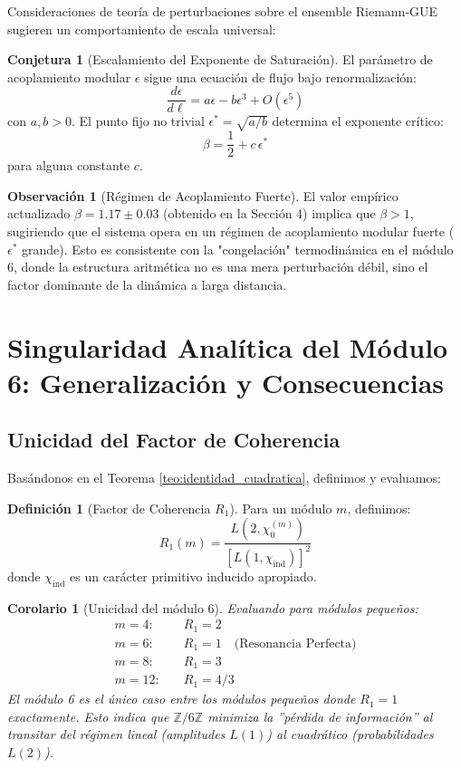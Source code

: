 \documentclass[12pt, a4paper]{article}
\theoremstyle{plain}
\newtheorem{corolario}[teorema]{Corolario}
\theoremstyle{definition}
\newtheorem{definicion}[teorema]{Definición}
\newtheorem{observacion}[teorema]{Observación}
\newtheorem{conjetura}[teorema]{Conjetura}
\newcommand{\Z}{\mathbb{Z}}
\begin{document}
Consideraciones de teoría de perturbaciones sobre el ensemble Riemann-GUE sugieren un comportamiento de escala universal:

\begin{conjetura}[Escalamiento del Exponente de Saturación]
El parámetro de acoplamiento modular $\epsilon$ sigue una ecuación de flujo bajo renormalización:
\[
\frac{d\epsilon}{d\ell} = a\epsilon - b\epsilon^3 + O(\epsilon^5)
\]
con $a, b > 0$. El punto fijo no trivial $\epsilon^* = \sqrt{a/b}$ determina el exponente crítico:
\[
\beta = \frac{1}{2} + c\,\epsilon^*
\]
para alguna constante $c$.
\end{conjetura}

\begin{observacion}[Régimen de Acoplamiento Fuerte]
El valor empírico actualizado $\beta = 1.17 \pm 0.03$ (obtenido en la Sección 4) implica que $\beta > 1$, sugiriendo que el sistema opera en un régimen de acoplamiento modular fuerte ($\epsilon^*$ grande). Esto es consistente con la "congelación" termodinámica en el módulo 6, donde la estructura aritmética no es una mera perturbación débil, sino el factor dominante de la dinámica a larga distancia.
\end{observacion}

\section{Singularidad Analítica del Módulo 6: Generalización y Consecuencias}

\subsection{Unicidad del Factor de Coherencia}

Basándonos en el Teorema \ref{teo:identidad_cuadratica}, definimos y evaluamos:

\begin{definicion}[Factor de Coherencia $R_1$]
Para un módulo $m$, definimos:
\[
R_1(m) = \frac{L(2, \chi_0^{(m)})}{[L(1, \chi_{\text{ind}})]^2}
\]
donde $\chi_{\text{ind}}$ es un carácter primitivo inducido apropiado.
\end{definicion}

\begin{corolario}[Unicidad del módulo 6]
Evaluando para módulos pequeños:
\begin{align*}
m=4: & \quad R_1 = 2 \\
m=6: & \quad R_1 = 1 \quad \text{(Resonancia Perfecta)} \\
m=8: & \quad R_1 = 3 \\
m=12: & \quad R_1 = 4/3
\end{align*}
El módulo 6 es el único caso entre los módulos pequeños donde $R_1=1$ exactamente. Esto indica que $\Z/6\Z$ minimiza la ''pérdida de información'' al transitar del régimen lineal (amplitudes $L(1)$) al cuadrático (probabilidades $L(2)$).
\end{corolario}
\end{document}
